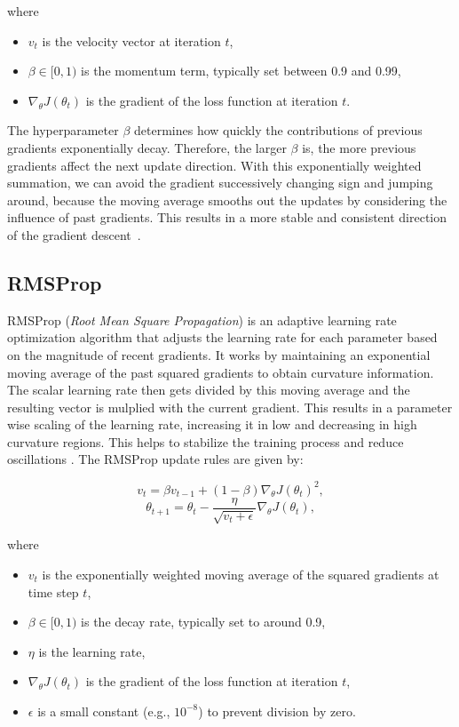 where
\begin{itemize}
    \item $v_t$ is the velocity vector at iteration $t$,
    \item $\beta \in [0, 1) $ is the momentum term, typically set between 0.9 and 0.99,
    \item $\nabla_{\theta} J(\theta_t)$ is the gradient of the loss function at iteration $t$.
\end{itemize}
The hyperparameter $\beta$ determines how quickly the contributions of previous gradients
exponentially decay. Therefore, the larger $\beta$ is, the more previous gradients affect
the next update direction. With this exponentially weighted summation, we can avoid the gradient successively changing sign
and jumping around, because the moving average smooths out the updates by considering the influence of past gradients.
This results in a more stable and consistent direction of the gradient descent~\cite{Goodfellow-et-al-2016}.

\subsection{RMSProp}
\label{sec:rmsprop}

RMSProp (\emph{Root Mean Square Propagation}) \cite{hintonrms} is an adaptive learning rate optimization algorithm that adjusts the learning rate
for each parameter based on the magnitude of recent gradients.
It works by maintaining an exponential moving average of the past squared gradients to obtain curvature information. The scalar learning rate
then gets divided by this moving average and the resulting vector is mulplied with the current gradient.
This results in a parameter wise scaling of the learning rate, increasing it in low and
decreasing in high curvature regions.
This helps to stabilize the training process and reduce oscillations \cite{Goodfellow-et-al-2016}. The RMSProp update rules are given by:

\[v_t = \beta v_{t-1} + (1 - \beta) \nabla_{\theta} J(\theta_t)^2,\]
\[\theta_{t+1} = \theta_t - \frac{\eta}{\sqrt{v_t + \epsilon}} \nabla_{\theta} J(\theta_t),\]

where
\begin{itemize}
    \item $v_t$ is the exponentially weighted moving average of the squared gradients at time step $t$,
    \item $\beta \in [0, 1) $ is the decay rate, typically set to around 0.9,
    \item $\eta$ is the learning rate,
    \item $\nabla_{\theta} J(\theta_t)$ is the gradient of the loss function at iteration $t$,
    \item $\epsilon$ is a small constant (e.g., $10^{-8}$) to prevent division by zero.
\end{itemize}

